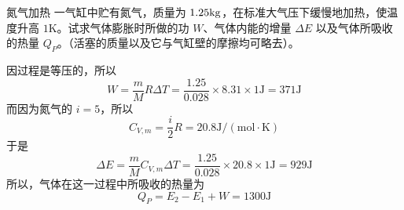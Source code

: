 \begin{example}{氮气加热}
一气缸中贮有氮气，质量为 $1.25\rm kg$，在标准大气压下缓慢地加热，使温度升高 $1\mathrm K$。试求气体膨胀时所做的功 $W$、气体内能的增量 $\Delta E$ 以及气体所吸收的热量 $Q_P$。（活塞的质量以及它与气缸壁的摩擦均可略去）。

因过程是等压的，所以
\begin{equation}
W=\frac{m}{M} R \Delta T=\frac{1.25}{0.028} \times 8.31 \times 1 \mathrm{J}=371 \mathrm{J}
\end{equation}
而因为氮气的 $i=5$，所以
\begin{equation}
C_{V, {m}}=\frac{i}{2} R=20.8 \mathrm{J} /(\mathrm{mol} \cdot \mathrm{K})
\end{equation}
于是
\begin{equation}
\Delta E=\frac{m}{M} C_{V, {m}} \Delta T=\frac{1.25}{0.028} \times 20.8 \times 1 \mathrm{J}=929 \mathrm{J}
\end{equation}
所以，气体在这一过程中所吸收的热量为
\begin{equation}
Q_{P}=E_{2}-E_{1}+W=1300 \mathrm{J}
\end{equation}
\end{example}
